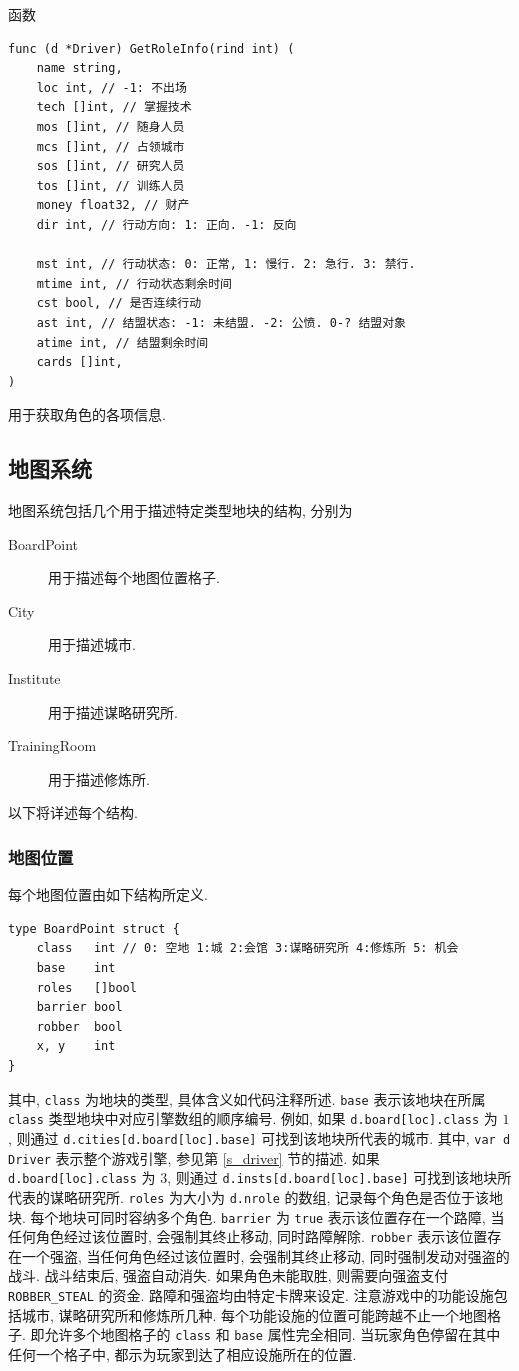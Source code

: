 \documentclass[UTF8, zihao=-4]{ctexart} %
\newcommand{\lcode}{\lstinline} % 段内插入代码
\begin{document}
函数 
\begin{lstlisting}
func (d *Driver) GetRoleInfo(rind int) (
	name string,
	loc int, // -1: 不出场
	tech []int, // 掌握技术
	mos []int, // 随身人员
	mcs []int, // 占领城市
	sos []int, // 研究人员
	tos []int, // 训练人员
	money float32, // 财产
	dir int, // 行动方向: 1: 正向. -1: 反向

	mst int, // 行动状态: 0: 正常, 1: 慢行. 2: 急行. 3: 禁行.
	mtime int, // 行动状态剩余时间
	cst bool, // 是否连续行动
	ast int, // 结盟状态: -1: 未结盟. -2: 公愤. 0-? 结盟对象
	atime int, // 结盟剩余时间
	cards []int,
) 
\end{lstlisting}
用于获取角色的各项信息.

\subsection{地图系统}
\label{s_board}
地图系统包括几个用于描述特定类型地块的结构, 分别为
\begin{description}
    \item [BoardPoint] 用于描述每个地图位置格子.
    \item [City] 用于描述城市.
    \item [Institute] 用于描述谋略研究所.
    \item [TrainingRoom] 用于描述修炼所.
\end{description}
以下将详述每个结构.

\subsubsection{地图位置}
每个地图位置由如下结构所定义.
\begin{lstlisting}
type BoardPoint struct {
	class   int // 0: 空地 1:城 2:会馆 3:谋略研究所 4:修炼所 5: 机会
	base    int
	roles   []bool
	barrier bool
	robber  bool
	x, y    int
}
\end{lstlisting}
其中, \lcode{class} 为地块的类型, 具体含义如代码注释所述. 
\lcode{base} 表示该地块在所属 \lcode{class} 类型地块中对应引擎数组的顺序编号.
例如, 如果 \lcode{d.board[loc].class} 为 $1$, 则通过 \lcode{d.cities[d.board[loc].base]} 可找到该地块所代表的城市.
其中, \lcode{var d Driver} 表示整个游戏引擎, 参见第 \ref{s_driver} 节的描述.
如果 \lcode{d.board[loc].class} 为 $3$, 则通过 \lcode{d.insts[d.board[loc].base]} 可找到该地块所代表的谋略研究所.
\lcode{roles} 为大小为 \lcode{d.nrole} 的数组, 记录每个角色是否位于该地块. 每个地块可同时容纳多个角色.
\lcode{barrier} 为 \lcode{true} 表示该位置存在一个路障, 当任何角色经过该位置时, 会强制其终止移动, 
同时路障解除. \lcode{robber} 表示该位置存在一个强盗, 当任何角色经过该位置时, 
会强制其终止移动, 同时强制发动对强盗的战斗. 战斗结束后, 强盗自动消失. 
如果角色未能取胜, 则需要向强盗支付 \lcode{ROBBER_STEAL} 的资金.
路障和强盗均由特定卡牌来设定. 
注意游戏中的功能设施包括城市, 谋略研究所和修炼所几种. 每个功能设施的位置可能跨越不止一个地图格子.
即允许多个地图格子的 \lcode{class} 和 \lcode{base} 属性完全相同. 当玩家角色停留在其中任何一个格子中, 
都示为玩家到达了相应设施所在的位置.
\end{document}
